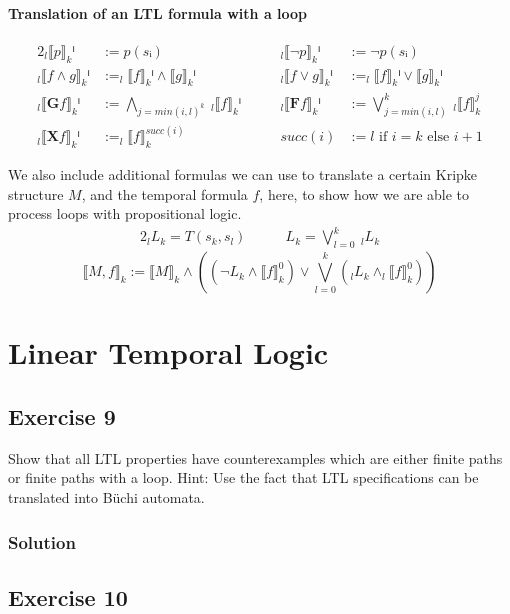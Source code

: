 \documentclass[a4paper, 12pt]{article}
\begin{document}
\paragraph{Translation of an LTL formula with a loop}
\begin{alignat*}{2}
    _l⟦p⟧_kⁱ            &:= p(sᵢ)\quad\quad&
    _l⟦¬p⟧_kⁱ           &:= ¬ p(sᵢ)\\
    _l⟦f ∧ g⟧_kⁱ        &:= _l⟦f⟧_kⁱ ∧ ⟦g⟧_kⁱ\quad\quad&
    _l⟦f ∨ g⟧_kⁱ        &:= _l⟦f⟧_kⁱ ∨ ⟦g⟧_kⁱ\\
    _l⟦\mathbf{G} f⟧_kⁱ &:= ⋀_{j=min(i,l)^k} ~ _l⟦f⟧_kⁱ\quad\quad&
    _l⟦\mathbf{F} f⟧_kⁱ &:= ⋁_{j=min(i,l)}^k ~ _l⟦f⟧_k^{j}\\
    _l⟦\mathbf{X} f⟧_kⁱ &:= _l⟦f⟧_k^{succ(i)}\quad\quad&
    succ(i)             &:= l \text{ if } i = k \text{ else } i+1
\end{alignat*}

We also include additional formulas we can use to translate a certain Kripke
structure $M$, and the temporal formula $f$, here, to show how we are able to
process loops with propositional logic.
\begin{alignat*}{2}
    _l L _k = T(s_k, s_l)\quad\quad&
    L_k = ⋁_{l=0}^k ~ _l L _k
\end{alignat*}
\[
    ⟦M, f⟧_k := ⟦M⟧_k ∧
    \left(
          \left( ¬ L_k ∧ ⟦f⟧_k^0 \right) ∨
          ⋁_{l=0}^k \left( _l L _k ∧ _l ⟦ f ⟧_k^0 \right)
    \right)
\]

\section{Linear Temporal Logic}

\subsection{Exercise 9}

Show that all LTL properties have counterexamples which are either finite
paths or finite paths with a loop. Hint: Use the fact that LTL specifications
can be translated into Büchi automata.

\subsubsection{Solution}



\subsection{Exercise 10}
\end{document}
